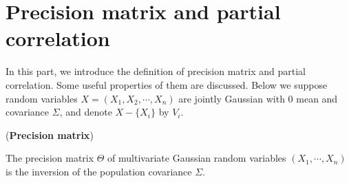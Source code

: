 \section{Precision matrix and partial correlation}
\label{subsec: pcorrandprec}
In this part, we introduce the definition of precision matrix and partial correlation. 
Some useful properties of them are discussed. 
Below we suppose random variables $X=(X_1,X_2,\cdots,X_n)$ are jointly Gaussian with 0 mean and covariance $\Sigma$,  
and denote $X-\{X_i\}$ by $V_i$. 

\begin{definition}(\textbf{Precision matrix})

    The precision matrix $\Theta$ of multivariate Gaussian random variables $(X_1,\cdots,X_n)$ is the inversion of the population covariance $\Sigma$.
\end{definition}

